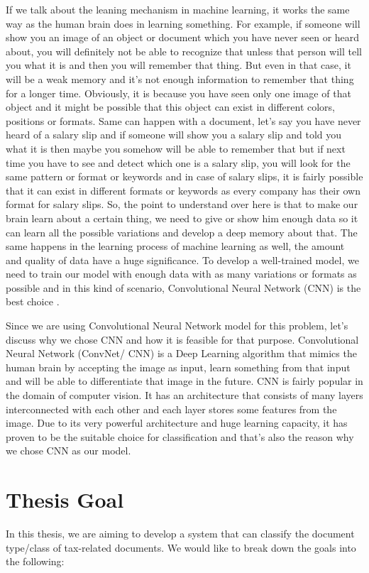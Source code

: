 If we talk about the leaning mechanism in machine learning, it works the same way as the human brain does in learning something. For example, if someone will show you an image of an object or document which you have never seen or heard about, you will definitely not be able to recognize that unless that person will tell you what it is and then you will remember that thing. But even in that case, it will be a weak memory and it's not enough information to remember that thing for a longer time. Obviously, it is because you have seen only one image of that object and it might be possible that this object can exist in different colors, positions or formats. Same can happen with a document, let's say you have never heard of a salary slip and if someone will show you a salary slip and told you what it is then maybe you somehow will be able to remember that but if next time you have to see and detect which one is a salary slip, you will look for the same pattern or format or keywords and in case of salary slips, it is fairly possible that it can exist in different formats or keywords as every company has their own format for salary slips. So, the point to understand over here is that to make our brain learn about a certain thing, we need to give or show him enough data so it can learn all the possible variations and develop a deep memory about that. The same happens in the learning process of machine learning as well, the amount and quality of data have a huge significance. To develop a well-trained model, we need to train our model with enough data with as many variations or formats as possible and in this kind of scenario, Convolutional Neural Network (CNN) is the best choice \cite{1708.03273} \cite{Krizhevsky}.
\newline
\par
Since we are using Convolutional Neural Network model for this problem, let's discuss why we chose CNN and how it is feasible for that purpose. Convolutional Neural Network (ConvNet/ CNN) is a Deep Learning algorithm that mimics the human brain by accepting the image as input, learn something from that input and will be able to differentiate that image in the future. CNN is fairly popular in the domain of computer vision. It has an architecture that consists of many layers interconnected with each other and each layer stores some features from the image. Due to its very powerful architecture and huge learning capacity, it has proven to be the suitable choice for classification and that's also the reason why we chose CNN as our model.
\section{Thesis Goal}
In this thesis, we are aiming to develop a system that can classify the document type/class of tax-related documents. We would like to break down the goals into the following:
\newline
\par
